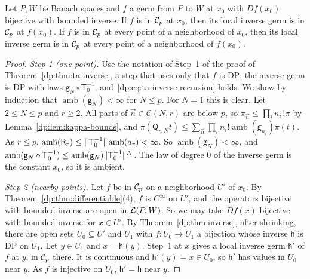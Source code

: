 \begin{theorem}\label{dp:thm:cp-inverse}
Let $P,W$ be Banach spaces and $f$ a germ from $P$ to $W$ at $x_0$ with $Df(x_0)$ bijective with bounded inverse. If $f$ is in $\mathcal{C}_p$ at $x_0$, then its local inverse germ is in $\mathcal{C}_p$ at $f(x_0)$. If $f$ is in $\mathcal{C}_p$ at every point of a neighborhood of $x_0$, then its local inverse germ is in $\mathcal{C}_p$ at every point of a neighborhood of $f(x_0)$.
\end{theorem}

\begin{proof}
\emph{Step 1 (one point).} Use the notation of Step~1 of the proof of Theorem~\ref{dp:thm:ta-inverse}, a step that uses only that $f$ is DP: the inverse germ is DP with laws $\mathsf g_N\circ\mathsf T_0^{-1}$, and~\eqref{dp:eq:ta-inverse-recursion} holds. We show by induction that $\operatorname{amb}(\mathsf g_N)<\infty$ for $N\le p$. For $N=1$ this is clear. Let $2\le N\le p$ and $r\ge2$. All parts of $\vec n\in\mathcal C(N,r)$ are below $p$, so $\pi_{\vec n}\le\prod_in_i!\,\pi$ by Lemma~\ref{dp:lem:kappa-bounds}, and $\pi(\mathsf Q_{r,N}t)\le\sum_{\vec n}\prod_in_i!\operatorname{amb}(\mathsf g_{n_i})\pi(t)$. As $r\le p$, $\operatorname{amb}(\mathsf R_r)\le\lVert \mathsf T_0^{-1}\rVert\operatorname{amb}(a_r)<\infty$. So $\operatorname{amb}(\mathsf g_N)<\infty$, and $\operatorname{amb}(\mathsf g_N\circ\mathsf T_0^{-1})\le\operatorname{amb}(\mathsf g_N)\lVert \mathsf T_0^{-1}\rVert^N$. The law of degree $0$ of the inverse germ is the constant $x_0$, so it is ambient.

\emph{Step 2 (nearby points).} Let $f$ be in $\mathcal{C}_p$ on a neighborhood $U'$ of $x_0$. By Theorem~\ref{dp:thm:differentiable}(4), $f$ is $C^\infty$ on $U'$, and the operators bijective with bounded inverse are open in $\mathcal L(P,W)$. So we may take $Df(x)$ bijective with bounded inverse for $x\in U'$. By Theorem~\ref{dp:thm:inverse}, after shrinking, there are open sets $U_0\subseteq U'$ and $U_1$ with $f\colon U_0\to U_1$ a bijection whose inverse $\mathsf h$ is DP on $U_1$. Let $y\in U_1$ and $x=\mathsf h(y)$. Step~1 at $x$ gives a local inverse germ $\mathsf h'$ of $f$ at $y$, in $\mathcal{C}_p$ there. It is continuous and $\mathsf h'(y)=x\in U_0$, so $\mathsf h'$ has values in $U_0$ near $y$. As $f$ is injective on $U_0$, $\mathsf h'=\mathsf h$ near $y$.
\end{proof}

